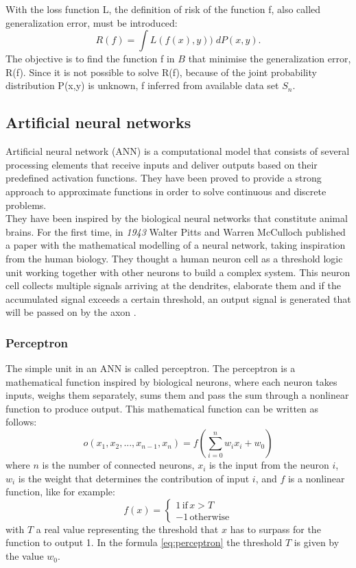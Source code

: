 With the loss function L, the definition of risk of the function f, also called generalization error, must be introduced:
\[
R(f) = \int L(f(x),y)) \; dP(x,y). 
\]
The objective is to find the function f in $B$ that minimise the generalization error, R(f). Since it is not possible to solve R(f), because of the joint probability distribution P(x,y) is unknown, f inferred from available data set $S_n$.

\subsection{Artificial neural networks}
Artificial neural network (\gls{ANN}) is a computational model that consists of several processing elements that receive inputs and deliver outputs based on their predefined activation functions.
They have been proved to provide a strong approach to approximate functions in order to solve continuous and discrete problems. \\

They have been inspired by the biological neural networks that constitute animal brains. For the first time, in \emph{1943} Walter Pitts and Warren McCulloch published a paper with the mathematical modelling of a neural network, taking inspiration from the human biology. They thought a human neuron cell as a threshold logic unit working together with other neurons to build a complex system. This neuron cell collects multiple signals arriving at the dendrites, elaborate them and if the accumulated signal exceeds a certain threshold, an output signal is generated that will be passed on by the axon \cite{McCulloch1943}. %

\subsubsection{Perceptron}
The simple unit in an \gls{ANN} is called perceptron. The perceptron is a mathematical function inspired by biological neurons, where each neuron takes inputs, weighs them separately, sums them and pass the sum through a nonlinear function to produce output. This mathematical function can be written as follows:
\begin{equation} \label{eq:perceptron}
    o(x_1,x_2,...,x_{n-1}, x_n) = f(\sum_{i=0}^n w_i x_i + w_0)
\end{equation}
\noindent where $n$ is the number of connected neurons, $x_i$ is the input from the neuron $i$, $w_i$ is the weight that determines the contribution of input $i$, and $f$ is a nonlinear function, like for example: 
\begin{equation*}
  f(x) =
    \begin{cases}
      1 \, \text{if} \, x > T \\
      -1 \, \text{otherwise}
    \end{cases}       
\end{equation*}
\noindent with $T$ a real value representing the threshold that $x$ has to surpass for the function to output 1. In the formula \ref{eq:perceptron} the threshold $T$ is given by the value $w_0$. \\

